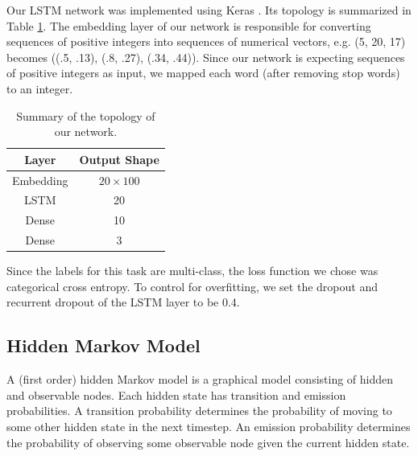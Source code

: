 \documentclass{article}
\begin{document}
Our LSTM network was implemented using Keras \cite{chollet2015keras}. 
Its topology is summarized in Table \ref{tab:lstmtop}. The embedding
layer of our network is responsible for converting sequences of positive
integers into sequences of numerical vectors, e.g. (5, 20, 17) becomes
((.5, .13), (.8, .27), (.34, .44)). Since our network is expecting
sequences of positive integers as input, we mapped each word (after
removing stop words) to an integer.

\begin{table}[!ht]
    \centering
    \begin{tabular}{|c|c|}
        \hline
        Layer & Output Shape \\
        \hline
        Embedding & $20 \times 100$ \\
        LSTM & 20 \\
        Dense & 10 \\
        Dense & 3 \\
        \hline
    \end{tabular}
    \caption{Summary of the topology of our network.}
    \label{tab:lstmtop}
\end{table}

Since the labels for this task are multi-class, the loss function we 
chose was categorical cross entropy. To control for overfitting, we
set the dropout and recurrent dropout of the LSTM layer to be 0.4.

\subsection{Hidden Markov Model}

A (first order) hidden Markov model is a graphical model consisting of hidden and observable
nodes. Each hidden state has transition and emission probabilities. A
transition probability determines the probability of moving to some
other hidden state in the next timestep. An emission probability 
determines the probability of observing some observable node given
the current hidden state. 
\end{document}
